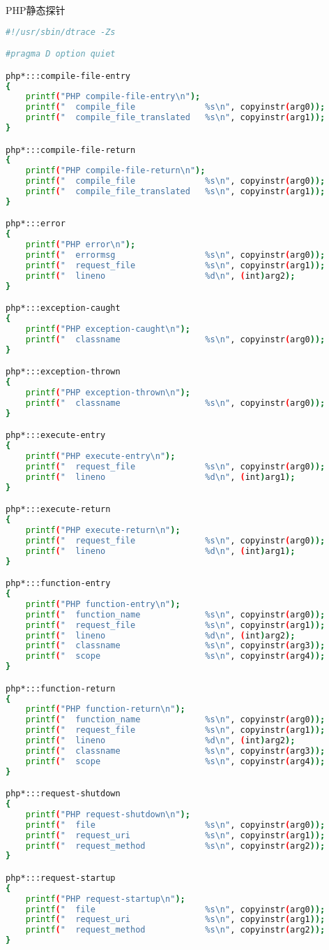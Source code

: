 \begin{example}
PHP静态探针
\begin{lstlisting}[language=bash]
#!/usr/sbin/dtrace -Zs

#pragma D option quiet

php*:::compile-file-entry
{
    printf("PHP compile-file-entry\n");
    printf("  compile_file              %s\n", copyinstr(arg0));
    printf("  compile_file_translated   %s\n", copyinstr(arg1));
}

php*:::compile-file-return
{
    printf("PHP compile-file-return\n");
    printf("  compile_file              %s\n", copyinstr(arg0));
    printf("  compile_file_translated   %s\n", copyinstr(arg1));
}

php*:::error
{
    printf("PHP error\n");
    printf("  errormsg                  %s\n", copyinstr(arg0));
    printf("  request_file              %s\n", copyinstr(arg1));
    printf("  lineno                    %d\n", (int)arg2);
}

php*:::exception-caught
{
    printf("PHP exception-caught\n");
    printf("  classname                 %s\n", copyinstr(arg0));
}

php*:::exception-thrown
{
    printf("PHP exception-thrown\n");
    printf("  classname                 %s\n", copyinstr(arg0));
}

php*:::execute-entry
{
    printf("PHP execute-entry\n");
    printf("  request_file              %s\n", copyinstr(arg0));
    printf("  lineno                    %d\n", (int)arg1);
}

php*:::execute-return
{
    printf("PHP execute-return\n");
    printf("  request_file              %s\n", copyinstr(arg0));
    printf("  lineno                    %d\n", (int)arg1);
}

php*:::function-entry
{
    printf("PHP function-entry\n");
    printf("  function_name             %s\n", copyinstr(arg0));
    printf("  request_file              %s\n", copyinstr(arg1));
    printf("  lineno                    %d\n", (int)arg2);
    printf("  classname                 %s\n", copyinstr(arg3));
    printf("  scope                     %s\n", copyinstr(arg4));
}

php*:::function-return
{
    printf("PHP function-return\n");
    printf("  function_name             %s\n", copyinstr(arg0));
    printf("  request_file              %s\n", copyinstr(arg1));
    printf("  lineno                    %d\n", (int)arg2);
    printf("  classname                 %s\n", copyinstr(arg3));
    printf("  scope                     %s\n", copyinstr(arg4));
}

php*:::request-shutdown
{
    printf("PHP request-shutdown\n");
    printf("  file                      %s\n", copyinstr(arg0));
    printf("  request_uri               %s\n", copyinstr(arg1));
    printf("  request_method            %s\n", copyinstr(arg2));
}

php*:::request-startup
{
    printf("PHP request-startup\n");
    printf("  file                      %s\n", copyinstr(arg0));
    printf("  request_uri               %s\n", copyinstr(arg1));
    printf("  request_method            %s\n", copyinstr(arg2));
}
\end{lstlisting}
\end{example}

